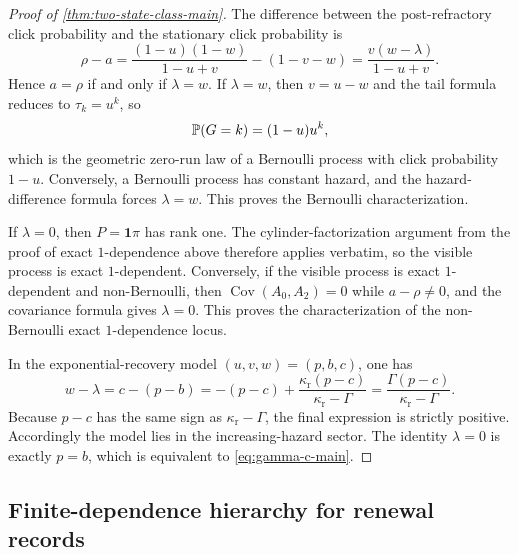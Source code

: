 \begin{proof}[Proof of \cref{thm:two-state-class-main}]
The difference between the post-refractory click probability and the stationary click probability is
\[
\rho-a
=
\frac{(1-u)(1-w)}{1-u+v}-(1-v-w)
=
\frac{v(w-\lambda)}{1-u+v}.
\]
Hence $a=\rho$ if and only if $\lambda=w$. If $\lambda=w$, then $v=u-w$ and the tail formula reduces to $\tau_k=u^k$, so
\[
\mathbb{P}(G=k)=(1-u)u^k,
\]
which is the geometric zero-run law of a Bernoulli process with click probability $1-u$. Conversely, a Bernoulli process has constant hazard, and the hazard-difference formula forces $\lambda=w$. This proves the Bernoulli characterization.

If $\lambda=0$, then $P=\mathbf 1\pi$ has rank one. The cylinder-factorization argument from the proof of exact $1$-dependence above therefore applies verbatim, so the visible process is exact $1$-dependent. Conversely, if the visible process is exact $1$-dependent and non-Bernoulli, then $\operatorname{Cov}(A_0,A_2)=0$ while $a-\rho\neq0$, and the covariance formula gives $\lambda=0$. This proves the characterization of the non-Bernoulli exact $1$-dependence locus.

In the exponential-recovery model $(u,v,w)=(p,b,c)$, one has
\[
w-\lambda
=
c-(p-b)
=
-(p-c)+\frac{\kappa_{\mathrm r}(p-c)}{\kappa_{\mathrm r}-\Gamma}
=
\frac{\Gamma(p-c)}{\kappa_{\mathrm r}-\Gamma}.
\]
Because $p-c$ has the same sign as $\kappa_{\mathrm r}-\Gamma$, the final expression is strictly positive. Accordingly the model lies in the increasing-hazard sector. The identity $\lambda=0$ is exactly $p=b$, which is equivalent to \eqref{eq:gamma-c-main}.
\end{proof}

\subsection{Finite-dependence hierarchy for renewal records}


